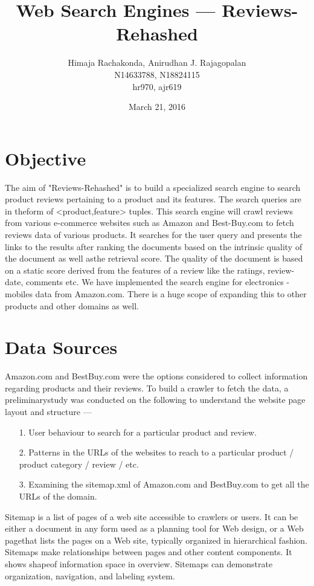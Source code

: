 \documentclass{article}
\begin{document}
\title{Web Search Engines --- Reviews-Rehashed}
\date{March 21, 2016}
\author{Himaja Rachakonda, Anirudhan J. Rajagopalan\\ N14633788, N18824115\\ hr970, ajr619}
\maketitle
\newpage

\section{Objective}
The aim of "Reviews-Rehashed" is to build a specialized search engine to search product reviews pertaining to a product and its features. The search queries are in theform of <product,feature> tuples. This search engine will crawl reviews from various e-commerce websites such as Amazon and Best-Buy.com to fetch reviews data of various products. It searches for the user query and presents the links to the results after ranking the documents based on the intrinsic quality of the document as well asthe retrieval score. The quality of the document is based on a static score derived from the features of a review like the ratings, review-date, comments etc. We have implemented the search engine for electronics - mobiles data from Amazon.com. There is a huge scope of expanding this to other products and other domains as well.

\section{Data Sources}
Amazon.com and BestBuy.com were the options considered to collect information regarding products and their reviews. To build a crawler to fetch the data, a preliminarystudy was conducted on the following to understand the website page layout and structure ---

\begin{enumerate}
	\item[1. ] User behaviour to search for a particular product and review.
	\item[2. ] Patterns in the URLs of the websites to reach to a particular product / product category / review / etc.
	\item[3. ] Examining the sitemap.xml of Amazon.com and BestBuy.com to get all the URLs of the domain.
\end{enumerate} 

Sitemap is a list of pages of a web site accessible to crawlers or users. It can be either a document in any form used as a planning tool for Web design, or a Web pagethat lists the pages on a Web site, typically organized in hierarchical fashion. Sitemaps make relationships between pages and other content components. It shows shapeof information space in overview. Sitemaps can demonstrate organization, navigation, and labeling system.
\end{document}

